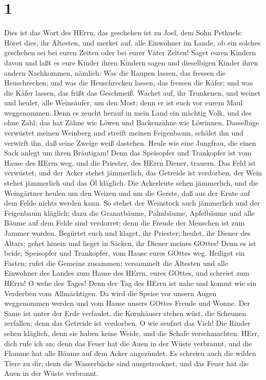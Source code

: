 \hypertarget{section}{%
\section{1}\label{section}}

 Dies ist das Wort des HErrn, das geschehen ist zu Joel, dem
Sohn Pethuels:  Höret dies, ihr Ältesten, und merket auf,
alle Einwohner im Lande, ob ein solches geschehen sei bei euren Zeiten
oder bei eurer Väter Zeiten!  Saget euren Kindern davon und
laßt es eure Kinder ihren Kindern sagen und dieselbigen Kinder ihren
andern Nachkommen,  nämlich: Was die Raupen lassen, das
fressen die Heuschrecken; und was die Heuschrecken lassen, das fressen
die Käfer; und was die Käfer lassen, das frißt das Geschmeiß.
 Wachet auf, ihr Trunkenen, und weinet und heulet, alle
Weinsäufer, um den Most; denn er ist euch vor eurem Maul weggenommen.
 Denn es zeucht herauf in mein Land ein mächtig Volk, und
des ohne Zahl; das hat Zähne wie Löwen und Backenzähne wie Löwinnen.
 Dasselbige verwüstet meinen Weinberg und streift meinen
Feigenbaum, schälet ihn und verwirft ihn, daß seine Zweige weiß
dastehen.  Heule wie eine Jungfrau, die einen Sack anlegt um
ihren Bräutigam!  Denn das Speisopfer und Trankopfer ist vom
Hause des HErrn weg, und die Priester, des HErrn Diener, trauern.
 Das Feld ist verwüstet, und der Acker stehet jämmerlich,
das Getreide ist verdorben, der Wein stehet jämmerlich und das Öl
kläglich.  Die Ackerleute sehen jämmerlich, und die
Weingärtner heulen um den Weizen und um die Gerste, daß aus der Ernte
auf dem Felde nichts werden kann.  So stehet der Weinstock
auch jämmerlich und der Feigenbaum kläglich; dazu die Granatbäume,
Palmbäume, Apfelbäume und alle Bäume auf dem Felde sind verdorret; denn
die Freude der Menschen ist zum Jammer worden.  Begürtet
euch und klaget, ihr Priester; heulet, ihr Diener des Altars; gehet
hinein und lieget in Säcken, ihr Diener meines GOttes! Denn es ist
beide, Speisopfer und Trankopfer, vom Hause eures GOttes weg.
 Heiliget ein Fasten; rufet die Gemeine zusammen;
versammelt die Ältesten und alle Einwohner des Landes zum Hause des
HErrn, eures GOttes, und schreiet zum HErrn!  O wehe des
Tages! Denn der Tag des HErrn ist nahe und kommt wie ein Verderben vom
Allmächtigen.  Da wird die Speise vor unsern Augen
weggenommen werden und vom Hause unsers GOttes Freude und Wonne.
 Der Same ist unter der Erde verfaulet, die Kornhäuser
stehen wüst, die Scheunen zerfallen; denn das Getreide ist verdorben.
 O wie seufzet das Vieh! Die Rinder sehen kläglich, denn
sie haben keine Weide, und die Schafe verschmachten.  HErr,
dich rufe ich an; denn das Feuer hat die Auen in der Wüste verbrannt,
und die Flamme hat alle Bäume auf dem Acker angezündet.  Es
schreien auch die wilden Tiere zu dir; denn die Wasserbäche sind
ausgetrocknet, und das Feuer hat die Auen in der Wüste verbrannt.

